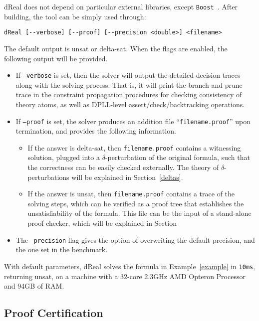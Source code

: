 \documentclass[envcountsect]{llncs}
\begin{document}
{\sf dReal} does not depend on particular external libraries, except
{\tt Boost}~\cite{}. After building, the tool can be simply used through:
\begin{verbatim}
dReal [--verbose] [--proof] [--precision <double>] <filename>
\end{verbatim}
The default output is {\sf unsat} or {\sf delta-sat}. When the flags are
enabled, the following output will be provided.
\begin{itemize}
 \item If {\tt --verbose} is set, then the solver will output the detailed
decision traces along with the solving process. That is, it will print the
branch-and-prune trace in the constraint propagation procedures for checking
consistency of theory atoms, as well as DPLL-level
assert/check/backtracking operations.
\item If {\tt --proof} is set, the solver produces an addition file
``{\tt filename.proof}'' upon termination, and provides the following
information.
\begin{itemize}
\item If the answer is {\sf delta-sat},
then {\tt filename.proof} contains a witnessing solution, plugged into a
$\delta$-perturbation of the original formula, such
that the correctness can be easily checked externally. The theory of
$\delta$-perturbations will be explained in Section~\ref{deltas}.

\item If the answer is {\sf unsat}, then {\tt filename.proof} contains a trace
of the solving steps, which can be verified as a proof tree that establishes the
unsatisfiability of the formula. This file can be the input of a stand-alone
proof checker, which will be explained in
Section~\cite{proof}
\end{itemize}
\item The {\tt --precision} flag gives the option of overwriting the
default precision, and the one set in the benchmark.
\end{itemize}

\begin{example}
With default parameters, {\sf dReal} solves the formula in
Example~\ref{example} in {\tt 10ms}, returning {\sf unsat}, on a machine with
a 32-core 2.3GHz AMD Opteron Processor and 94GB of RAM.
\end{example}

\subsection{Proof Certification}\label{proof}
\end{document}
